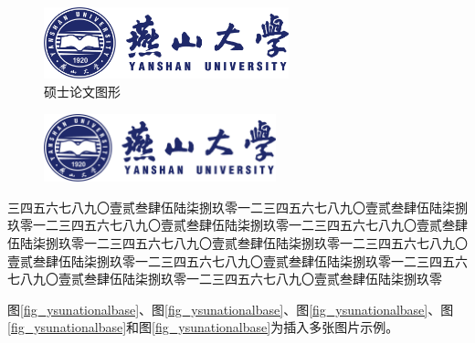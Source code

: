 \documentclass[master,academic]{ysuthesis} %
\begin{document}
			\begin{figure}[!ht]
				\centering
				\includegraphics[width=2.79in]{ysu_logo}
				\caption{硕士论文图形}
				\label{fig:ysu_logo}
			\end{figure}
			\begin{figure}[!ht]
				\centering
				\includegraphics[width=0.6\textwidth]{ysu_logo}
				\label{ysulogo}
            \end{figure}

		三四五六七八九〇壹贰叁肆伍陆柒捌玖零一二三四五六七八九〇壹贰叁肆伍陆柒捌玖零一二三四五六七八九〇壹贰叁肆伍陆柒捌玖零一二三四五六七八九〇壹贰叁肆伍陆柒捌玖零一二三四五六七八九〇壹贰叁肆伍陆柒捌玖零一二三四五六七八九〇壹贰叁肆伍陆柒捌玖零一二三四五六七八九〇壹贰叁肆伍陆柒捌玖零一二三四五六七八九〇壹贰叁肆伍陆柒捌玖零一二三四五六七八九〇壹贰叁肆伍陆柒捌玖零

		图\ref{fig_ysunationalbase}、图\ref{fig_ysunationalbase}、图\ref{fig_ysunationalbase}、图\ref{fig_ysunationalbase}和图\ref{fig_ysunationalbase}为插入多张图片示例。
\end{document}
